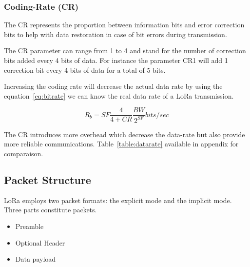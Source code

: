 \subsubsection{Coding-Rate (CR)}

The CR represents the proportion between information bits and error
correction bits to help with data restoration in case of bit errors
during transmission.

The CR parameter can range from 1 to 4 and stand for the number of correction
bits added every 4 bits of data.
For instance the parameter CR1 will add 1 correction bit every 4 bits of data
for a total of 5 bits.

Increasing the coding rate will decrease the actual data rate by using the
equation~\ref{eq:bitrate} we can know the real data rate of a LoRa transmission.

\begin{equation}
 \label{eq:datarate}
  R_{b} = SF \frac{4}{4 + CR} \frac{BW}{2^{SF}} bits/sec
\end{equation}

The CR introduces more overhead which decrease the data-rate but also
provide more reliable communications.
Table~\ref{table:datarate} available in appendix for comparaison.


\subsection{Packet Structure}

LoRa employs two packet formats:
the explicit mode and the implicit mode.
Three parts constitute packets.

\begin{itemize}
  \item Preamble
  \item Optional Header
  \item Data payload
\end{itemize}

